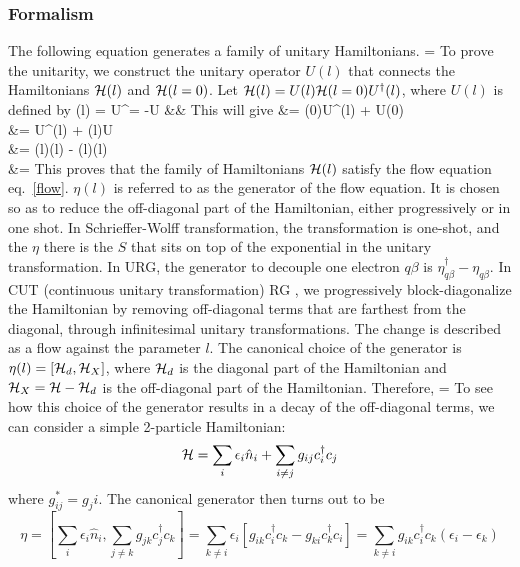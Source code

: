 \documentclass[12pt,twoside]{article}
\numberwithin{equation}{section}
\begin{document}
\subsubsection{Formalism}
The following equation generates a family of unitary Hamiltonians.
\beq[flow]
 = 
\eeq
To prove the unitarity\cite{kehrein}, we construct the unitary operator \(U(l)\) that connects the Hamiltonians \(\mathcal{H}(l)\) and \(\mathcal{H}(l=0)\). Let \(\mathcal{H}(l) = U(l)\mathcal{H}(l=0)U^\dagger(l)\), where \(U(l)\) is defined by
\beq
\eta(l) = U^\dagger = -U &&
\eeq
This will give
\beq
{} &= \ham(0)U^\dagger(l) + U\ham(0)\\
        &= U^\dagger\ham(l) + \ham(l)U\\
        &= \eta(l)\ham(l) - \ham(l)\eta(l)\\
        &=
\eeq
This proves that the family of Hamiltonians \(\mathcal{H}(l)\) satisfy the flow equation eq.~\ref{flow}. \(\eta(l)\) is referred to as the generator of the flow equation. It is chosen so as to reduce the off-diagonal part of the Hamiltonian, either progressively or in one shot. In Schrieffer-Wolff transformation, the transformation is one-shot, and the \(\eta\) there is the \(S\) that sits on top of the exponential in the unitary transformation. In URG, the generator to decouple one electron \(q\beta\) is \(\eta^\dagger_{q\beta} - \eta_{q\beta}\).
\pb In CUT (continuous unitary transformation) RG \cite{glazek-wilson}, we progressively block-diagonalize the Hamiltonian by removing off-diagonal terms that are farthest from the diagonal, through infinitesimal unitary transformations. The change is described as a flow against the parameter \(l\). The canonical choice of the generator is \(\eta(l) = \left[{\mathcal{H}_d,\mathcal{H}_X}\right]\), where \(\mathcal{H}_d\) is the diagonal part of the Hamiltonian and \(\mathcal{H}_X = \mathcal{H} - \mathcal{H}_d\) is the off-diagonal part of the Hamiltonian. Therefore,
\beq[cut]
 = 
\eeq
To see how this choice of the generator results in a decay of the off-diagonal terms, we can consider a simple 2-particle Hamiltonian:
\begin{equation}
	\mathcal{H} = \sum_i \epsilon_i \hat n_i + \sum_{i\neq j} g_{ij}c^\dagger_i c_j
\end{equation}
where \(g_{ij}^* = g_ji\). The canonical generator then turns out to be 
\begin{equation}
	\eta = \left[\sum_i \epsilon_i \hat n_i, \sum_{j\neq k} g_{jk}c^\dagger_j c_k\right] = \sum_{k\neq i} \epsilon_i\left[g_{ik}c^\dagger_i c_k - g_{ki}c^\dagger_k c_i\right] = \sum_{k\neq i} g_{ik}c^\dagger_i c_k \left(\epsilon_i - \epsilon_k\right)
\end{equation}
\end{document}
